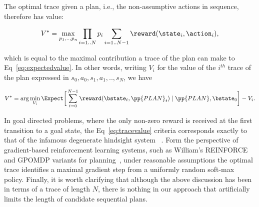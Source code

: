 \noindent The optimal trace given a plan, i.e., the non-assumptive
actions in sequence, therefore has value:

\[
V^* = \max_{p_1, .., p_n} \prod_{i=1..N} p_i \sum_{i=1..N-1}
\reward(\state_i, \action_i),
\]

\noindent which is equal to the maximal contribution a trace of the plan can
make to Eq~\ref{eq:expectedvalue}. In other words, writing $V_i$ for
the value of the $i^{th}$ trace of the plan expressed in $s_0, a_0,
s_1, a_1,.., s_N$, we have

\[
V^* = \arg\min_{V_i} \Expect \bigg{[} 
\sum_{t=0}^{N-1}  \reward(\bstate_t, \pp{PLAN}_t) \mid \pp{PLAN}, \bstate_0
\bigg{]} - V_i.
\]

In goal directed problems, where the only non-zero reward is received
at the first transition to a goal state, the Eq~\ref{eq:tracevalue}
criteria corresponds exactly to that of the infamous degenerate
hindsight system
~\cite{yoon:etal:2007}. Form the perspective of
gradient-based reinforcement learning systems, such as William's
REINFORCE and GPOMDP variants for planning~\cite{olivier:doug:2009},
under reasonable assumptions the optimal trace identifies a maximal
gradient step from a uniformly random soft-max policy. Finally, it is
worth clarifying that although the above discussion has been in terms
of a trace of length $N$, there is nothing in our approach that
artificially limits the length of candidate sequential plans.





